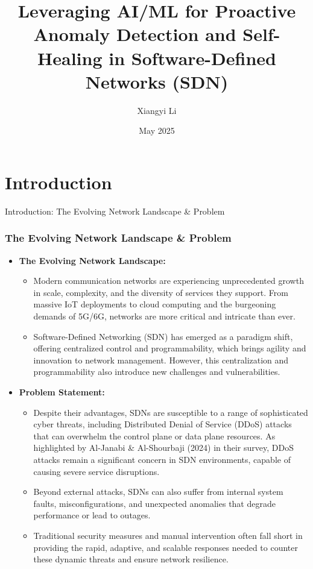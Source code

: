 \documentclass{beamer}
\title{Leveraging AI/ML for Proactive Anomaly Detection and Self-Healing in Software-Defined Networks (SDN)}
\author{Xiangyi Li}
\institute{Student ID: 017415996 \\ CS 258 - Computer Communication Systems}
\date{May 2025}
\begin{document}
\begin{frame}
  \titlepage
\end{frame}


\section{Introduction}

\begin{frame}{Introduction: The Evolving Network Landscape \& Problem}
  \frametitle{The Evolving Network Landscape \& Problem}
  \begin{itemize}
    \item \textbf{The Evolving Network Landscape:}
    \begin{itemize}
        \item Modern communication networks are experiencing unprecedented growth in scale, complexity, and the diversity of services they support. From massive IoT deployments to cloud computing and the burgeoning demands of 5G/6G, networks are more critical and intricate than ever.
        \item Software-Defined Networking (SDN) has emerged as a paradigm shift, offering centralized control and programmability, which brings agility and innovation to network management. However, this centralization and programmability also introduce new challenges and vulnerabilities.
    \end{itemize}
    \item \textbf{Problem Statement:}
    \begin{itemize}
        \item Despite their advantages, SDNs are susceptible to a range of sophisticated cyber threats, including Distributed Denial of Service (DDoS) attacks that can overwhelm the control plane or data plane resources. As highlighted by Al-Janabi \& Al-Shourbaji (2024) in their survey, DDoS attacks remain a significant concern in SDN environments, capable of causing severe service disruptions.
        \item Beyond external attacks, SDNs can also suffer from internal system faults, misconfigurations, and unexpected anomalies that degrade performance or lead to outages.
        \item Traditional security measures and manual intervention often fall short in providing the rapid, adaptive, and scalable responses needed to counter these dynamic threats and ensure network resilience.
    \end{itemize}
  \end{itemize}
\end{frame}
\end{document}
